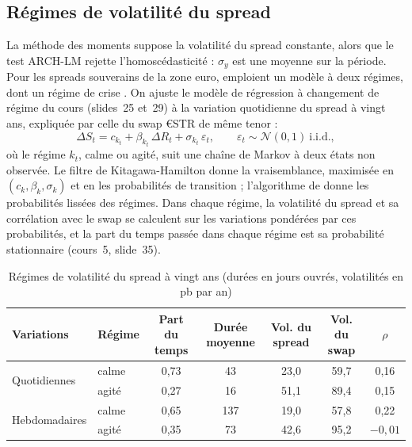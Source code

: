 \subsection{Régimes de volatilité du spread}
\label{sec:regimes}

La méthode des moments suppose la volatilité du spread constante, alors que le test ARCH-LM rejette
l'homoscédasticité : $\sigma_y$ est une moyenne sur la période. Pour les spreads souverains de la zone euro,
\citet{MonfortRenne2014} emploient un modèle à deux régimes, dont un régime de crise
\citep[cours~5, slides~99-101]{MPR2025}. On ajuste le modèle de régression à changement de régime du cours
(slides~25 et~29) à la variation quotidienne du spread à vingt ans, expliquée par celle du swap €STR de même
tenor :
\begin{equation}
\Delta S_t = c_{k_t} + \beta_{k_t}\,\Delta R_t + \sigma_{k_t}\,\varepsilon_t,\qquad \varepsilon_t \sim \mathcal N(0,1)\ \text{i.i.d.},
\end{equation}
où le régime $k_t$, calme ou agité, suit une chaîne de Markov à deux états non observée. Le filtre de
Kitagawa-Hamilton donne la vraisemblance, maximisée en $(c_k, \beta_k, \sigma_k)$ et en les probabilités de
transition \citep[cours~5, slide~39]{Hamilton1989,MPR2025} ; l'algorithme de \citet{Kim1994} donne les
probabilités lissées des régimes. Dans chaque régime, la volatilité du spread et sa corrélation avec le swap se
calculent sur les variations pondérées par ces probabilités, et la part du temps passée dans chaque régime est sa
probabilité stationnaire (cours~5, slide~35).

\begin{table}[htbp]
\centering\small
\caption{Régimes de volatilité du spread à vingt ans (durées en jours ouvrés, volatilités en pb par an)}
\label{tab:regimes}
\begin{tabular}{@{}llccccc@{}}
\toprule
Variations & Régime & Part du temps & Durée moyenne & Vol. du spread & Vol. du swap & $\rho$ \\
\midrule
\multirow{2}{*}{Quotidiennes} & calme & 0,73 & 43 & 23,0 & 59,7 & 0,16 \\
 & agité & 0,27 & 16 & 51,1 & 89,4 & 0,15 \\
\midrule
\multirow{2}{*}{Hebdomadaires} & calme & 0,65 & 137 & 19,0 & 57,8 & 0,22 \\
 & agité & 0,35 & 73 & 42,6 & 95,2 & $-0{,}01$ \\
\bottomrule
\end{tabular}
\end{table}

